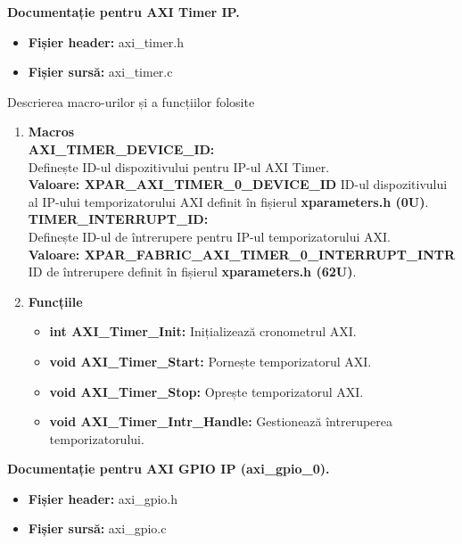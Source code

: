 \documentclass[12pt]{article}
\begin{document}
\textbf{Documentație pentru AXI Timer IP.}
 \begin{itemize}
    \item \textbf{Fișier header:} axi\_timer.h
    \item \textbf{Fișier sursă:} axi\_timer.c\\
 \end{itemize}
\hspace*{1cm}Descrierea macro-urilor și a funcțiilor folosite
\begin{enumerate}
    \item \textbf{Macros}\\
    \hspace*{1cm} \textbf{AXI\_TIMER\_DEVICE\_ID:} \\
    \hspace*{1cm} Definește ID-ul dispozitivului pentru IP-ul AXI Timer.\\
    \hspace*{1cm} \textbf{Valoare: XPAR\_AXI\_TIMER\_0\_DEVICE\_ID } ID-ul dispozitivului al IP-ului temporizatorului AXI definit în fișierul \textbf{xparameters.h (0U)}.\\
    \hspace*{1cm} \textbf{TIMER\_INTERRUPT\_ID:} \\
    \hspace*{1cm} Definește ID-ul de întrerupere pentru IP-ul temporizatorului AXI.\\
    \hspace*{1cm} \textbf{Valoare: XPAR\_FABRIC\_AXI\_TIMER\_0\_INTERRUPT\_INTR  } ID de întrerupere definit în fișierul \textbf{xparameters.h (62U)}.
    \item \textbf{Funcțiile}
        \begin{itemize}
            \item \textbf{int AXI\_Timer\_Init:} Inițializează cronometrul AXI.
            \item \textbf{void AXI\_Timer\_Start:} Pornește temporizatorul AXI.
            \item \textbf{void AXI\_Timer\_Stop:} Oprește temporizatorul AXI.
            \item \textbf{void AXI\_Timer\_Intr\_Handle:} Gestionează întreruperea temporizatorului.\\
        \end{itemize}
\end{enumerate}
\textbf{Documentație pentru AXI GPIO IP (axi\_gpio\_0).}
 \begin{itemize}
    \item \textbf{Fișier header:} axi\_gpio.h
    \item \textbf{Fișier sursă:} axi\_gpio.c\\
 \end{itemize}
\end{document}
